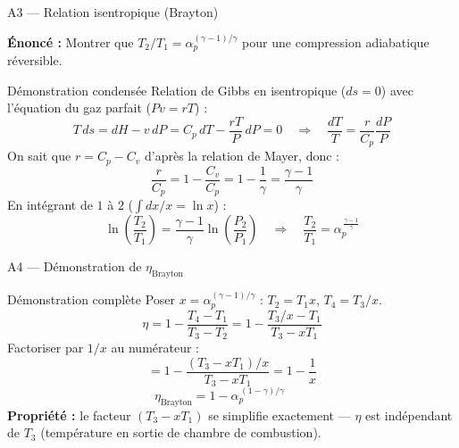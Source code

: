 \documentclass[aspectratio=43, 10pt]{beamer}
\newcommand{\rp}{\alpha_p}
\begin{document}
\begin{frame}{A3 --- Relation isentropique (Brayton)}

  \textbf{\'Enonc\'e :} Montrer que
  $T_2/T_1 = \rp^{(\gamma-1)/\gamma}$
  pour une compression adiabatique r\'eversible.

  \begin{block}{D\'emonstration condens\'ee}
    \small
    Relation de Gibbs en isentropique ($ds=0$) avec l'\'equation du gaz parfait ($Pv = rT$) :
    \[
      T\,ds = dH - v\,dP = C_p\,dT - \frac{rT}{P}\,dP = 0 
      \quad\Rightarrow\quad 
      \frac{dT}{T} = \frac{r}{C_p}\frac{dP}{P}
    \]
    \vspace{-4pt}
    On sait que $r = C_p - C_v$ d'apr\`es la relation de Mayer, donc :
    \[
      \frac{r}{C_p} = 1 - \frac{C_v}{C_p} = 1 - \frac{1}{\gamma} = \frac{\gamma-1}{\gamma}
    \]
    \vspace{-4pt}
    En int\'egrant de $1$ \`a $2$ ($\int dx/x = \ln x$) :
    \[
      \ln\!\left(\frac{T_2}{T_1}\right) = \frac{\gamma-1}{\gamma}\ln\!\left(\frac{P_2}{P_1}\right)
      \quad\Rightarrow\quad
      \boxed{\frac{T_2}{T_1} = \rp^{\,\frac{\gamma-1}{\gamma}}}
    \]
  \end{block}
\end{frame}

\begin{frame}{A4 --- D\'emonstration de $\eta_{\text{Brayton}}$}

  \begin{block}{D\'emonstration compl\`ete}
    Poser $x = \rp^{(\gamma-1)/\gamma}$ :
    $T_2 = T_1 x$, $T_4 = T_3/x$.
    \[
      \eta = 1 - \frac{T_4 - T_1}{T_3 - T_2}
           = 1 - \frac{T_3/x - T_1}{T_3 - xT_1}
    \]
    Factoriser par $1/x$ au num\'erateur :
    \[
      = 1 - \frac{(T_3 - xT_1)/x}{T_3 - xT_1}
      = 1 - \frac{1}{x}
    \]
    \[
      \boxed{\eta_{\text{Brayton}} = 1 - \rp^{\,(1-\gamma)/\gamma}}
      \qquad
    \]
    \textbf{Propri\'et\'e :} le facteur $(T_3 - xT_1)$ se simplifie
    exactement --- $\eta$ est ind\'ependant de $T_3$ (temp\'erature
    en sortie de chambre de combustion).
  \end{block}

\end{frame}
\end{document}
